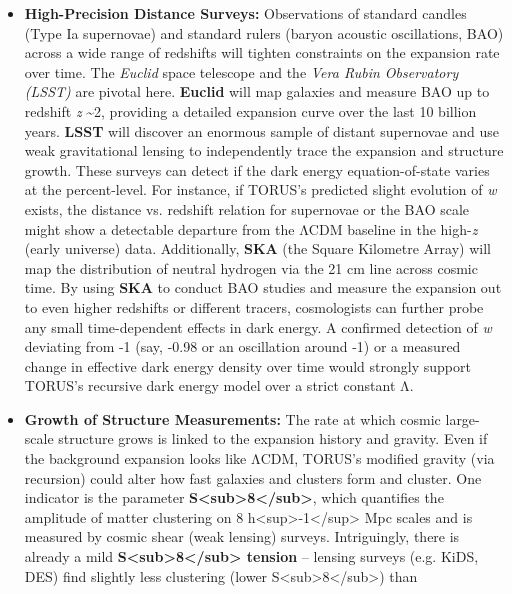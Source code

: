 \begin{itemize}
\item
  \textbf{High-Precision Distance Surveys:} Observations of standard
  candles (Type Ia supernovae) and standard rulers (baryon acoustic
  oscillations, BAO) across a wide range of redshifts will tighten
  constraints on the expansion rate over time. The \emph{Euclid} space
  telescope and the \emph{Vera Rubin Observatory (LSST)} are pivotal
  here. \textbf{Euclid} will map galaxies and measure BAO up to redshift
  \emph{z} \textasciitilde{}2, providing a detailed expansion curve over
  the last 10 billion years. \textbf{LSST} will discover an enormous
  sample of distant supernovae and use weak gravitational lensing to
  independently trace the expansion and structure growth. These surveys
  can detect if the dark energy equation-of-state varies at the
  percent-level. For instance, if TORUS's predicted slight evolution of
  \emph{w} exists, the distance vs. redshift relation for supernovae or
  the BAO scale might show a detectable departure from the ΛCDM baseline
  in the high-\emph{z} (early universe) data​. Additionally,
  \textbf{SKA} (the Square Kilometre Array) will map the distribution of
  neutral hydrogen via the 21 cm line across cosmic time. By using
  \textbf{SKA} to conduct BAO studies and measure the expansion out to
  even higher redshifts or different tracers, cosmologists can further
  probe any small time-dependent effects in dark energy​. A confirmed
  detection of \emph{w} deviating from -1 (say, -0.98 or an oscillation
  around -1) or a measured change in effective dark energy density over
  time would strongly support TORUS's recursive dark energy model over a
  strict constant Λ.
\item
  \textbf{Growth of Structure Measurements:} The rate at which cosmic
  large-scale structure grows is linked to the expansion history and
  gravity. Even if the background expansion looks like ΛCDM, TORUS's
  modified gravity (via recursion) could alter how fast galaxies and
  clusters form and cluster. One indicator is the parameter
  \textbf{S\textless{}sub\textgreater{}8\textless{}/sub\textgreater{}},
  which quantifies the amplitude of matter clustering on 8
  h\textless{}sup\textgreater{}-1\textless{}/sup\textgreater{} Mpc
  scales and is measured by cosmic shear (weak lensing) surveys.
  Intriguingly, there is already a mild
  \textbf{S\textless{}sub\textgreater{}8\textless{}/sub\textgreater{}
  tension} -- lensing surveys (e.g. KiDS, DES) find slightly less
  clustering (lower
  S\textless{}sub\textgreater{}8\textless{}/sub\textgreater{}) than

\end{itemize}

